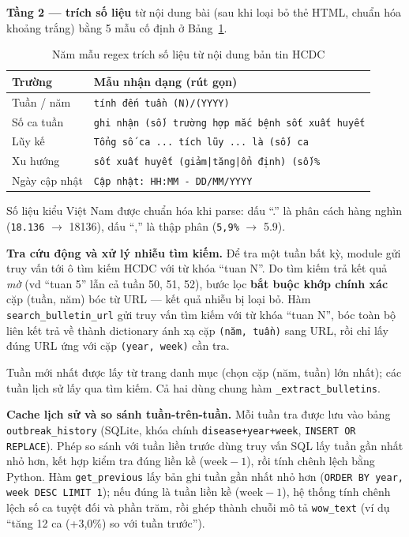 \documentclass[a4paper,13pt,3p,twoside,openany]{report}
\theoremstyle{definition}
\theoremstyle{remark}
\theoremstyle{definition}
\begin{document}
\textbf{Tầng 2 --- trích số liệu} từ nội dung bài (sau khi loại bỏ thẻ HTML, chuẩn hóa khoảng trắng) bằng 5 mẫu cố định ở Bảng~\ref{tab:outbreak-regex}.

\begin{table}[H]
\centering
\begin{tabular}{|l|p{8.5cm}|}
\hline
\textbf{Trường} & \textbf{Mẫu nhận dạng (rút gọn)} \\
\hline
Tuần / năm   & \texttt{tính đến tuần (N)/(YYYY)} \\
\hline
Số ca tuần   & \texttt{ghi nhận (số) trường hợp mắc bệnh sốt xuất huyết} \\
\hline
Lũy kế       & \texttt{Tổng số ca ... tích lũy ... là (số) ca} \\
\hline
Xu hướng     & \texttt{sốt xuất huyết (giảm|tăng|ổn định) (số)\%} \\
\hline
Ngày cập nhật & \texttt{Cập nhật: HH:MM - DD/MM/YYYY} \\
\hline
\end{tabular}
\caption{Năm mẫu regex trích số liệu từ nội dung bản tin HCDC}
\label{tab:outbreak-regex}
\end{table}

Số liệu kiểu Việt Nam được chuẩn hóa khi parse: dấu ``.'' là phân cách hàng nghìn (\texttt{18.136} $\to$ 18136), dấu ``,'' là thập phân (\texttt{5,9\%} $\to$ 5.9).

\textbf{Tra cứu động và xử lý nhiễu tìm kiếm.} Để tra một tuần bất kỳ, module gửi truy vấn tới ô tìm kiếm HCDC với từ khóa ``tuan N''. Do tìm kiếm trả kết quả \textit{mờ} (vd ``tuan 5'' lẫn cả tuần 50, 51, 52), bước lọc \textbf{bắt buộc khớp chính xác} cặp (tuần, năm) bóc từ URL --- kết quả nhiễu bị loại bỏ. Hàm \texttt{search\_bulletin\_url} gửi truy vấn tìm kiếm với từ khóa ``tuan N'', bóc toàn bộ liên kết trả về thành dictionary ánh xạ cặp \texttt{(năm, tuần)} sang URL, rồi chỉ lấy đúng URL ứng với cặp \texttt{(year, week)} cần tra.

Tuần mới nhất được lấy từ trang danh mục (chọn cặp (năm, tuần) lớn nhất); các tuần lịch sử lấy qua tìm kiếm. Cả hai dùng chung hàm \texttt{\_extract\_bulletins}.

\textbf{Cache lịch sử và so sánh tuần-trên-tuần.} Mỗi tuần tra được lưu vào bảng \texttt{outbreak\_history} (SQLite, khóa chính \texttt{disease+year+week}, \texttt{INSERT OR REPLACE}). Phép so sánh với tuần liền trước dùng truy vấn SQL lấy tuần gần nhất nhỏ hơn, kết hợp kiểm tra đúng liền kề ($\text{week}-1$), rồi tính chênh lệch bằng Python. Hàm \texttt{get\_previous} lấy bản ghi tuần gần nhất nhỏ hơn (\texttt{ORDER BY year, week DESC LIMIT 1}); nếu đúng là tuần liền kề ($\text{week}-1$), hệ thống tính chênh lệch số ca tuyệt đối và phần trăm, rồi ghép thành chuỗi mô tả \texttt{wow\_text} (ví dụ ``tăng 12 ca (+3{,}0\%) so với tuần trước'').
\end{document}
